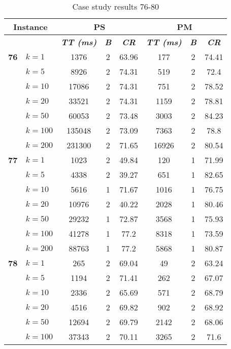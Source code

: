     \begin{table}[htbp]
    \caption{Case study results 76-80}
    \centering
    \begin{tabular}{|l|l|c|c|c|c|c|c|}
    \hline
    \multicolumn{ 2}{|c|}{\textbf{Instance}} & \multicolumn{ 3}{c|}{\textbf{PS}} & \multicolumn{ 3}{c|}{\textbf{PM}} \\ \hline
    \multicolumn{ 2}{|l|}{} & \textbf{\textit{TT (ms)}} & \textbf{\textit{B}} & \textbf{\textit{CR}} & \textbf{\textit{TT (ms)}} & \textbf{\textit{B}} & \textbf{\textit{CR}} \\ \hline
    \multicolumn{1}{|r|}{\textbf{76}} & $k=1$ & 1376 & 2 & 63.96 & 177 & 2 & 74.41 \\ 
     & $k=5$ & 8926 & 2 & 74.31 & 519 & 2 & 72.4 \\ 
     & $k=10$ & 17086 & 2 & 74.31 & 751 & 2 & 78.52 \\ 
     & $k=20$ & 33521 & 2 & 74.31 & 1159 & 2 & 78.81 \\ 
     & $k=50$ & 60053 & 2 & 73.48 & 3003 & 2 & 84.23 \\ 
     & $k=100$ & 135048 & 2 & 73.09 & 7363 & 2 & 78.8 \\ 
     & $k=200$ & 231300 & 2 & 71.65 & 16926 & 2 & 80.54 \\ \hline
    \multicolumn{1}{|r|}{\textbf{77}} & $k=1$ & 1023 & 2 & 49.84 & 120 & 1 & 71.99 \\ 
     & $k=5$ & 4338 & 2 & 39.27 & 651 & 1 & 82.65 \\ 
     & $k=10$ & 5616 & 1 & 71.67 & 1016 & 1 & 76.75 \\ 
     & $k=20$ & 10976 & 2 & 40.22 & 2028 & 1 & 80.46 \\ 
     & $k=50$ & 29232 & 1 & 72.87 & 3568 & 1 & 75.93 \\ 
     & $k=100$ & 41278 & 1 & 77.2 & 8318 & 1 & 73.59 \\ 
     & $k=200$ & 88763 & 1 & 77.2 & 5868 & 1 & 80.87 \\ \hline
    \multicolumn{1}{|r|}{\textbf{78}} & $k=1$ & 265 & 2 & 69.04 & 49 & 2 & 63.24 \\ 
     & $k=5$ & 1194 & 2 & 71.41 & 262 & 2 & 67.07 \\ 
     & $k=10$ & 2336 & 2 & 65.69 & 571 & 2 & 68.79 \\ 
     & $k=20$ & 4516 & 2 & 69.82 & 902 & 2 & 68.92 \\ 
     & $k=50$ & 12694 & 2 & 69.79 & 2142 & 2 & 68.06 \\ 
     & $k=100$ & 37343 & 2 & 70.11 & 3265 & 2 & 71.6 \\ 

\end{tabular}
\end{table}
